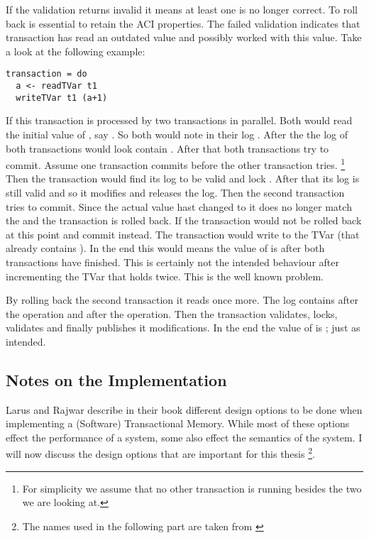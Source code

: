 If the validation returns invalid it means at least one  is no longer correct. To roll back is essential 
to retain the ACI properties. The failed validation indicates that transaction has read an outdated value and possibly worked 
with this value. Take a look at the following example:
\begin{lstlisting}
transaction = do 
  a <- readTVar t1
  writeTVar t1 (a+1)
\end{lstlisting}
If this transaction is processed by two transactions in parallel. Both would read the initial value of , say .
So both would note in their log . After the  the log of both transactions would look contain 
. After that both transactions try to commit. Assume one transaction commits before the other transaction tries.
\footnote{For simplicity we assume that no other transaction is running besides the two we are looking at.}
Then the transaction would find its log to be valid and lock . After that its log is still valid and so it modifies 
 and releases the log. 
Then the second transaction tries to commit. Since the actual value hast changed to  it does no longer match 
the  and the transaction is rolled back. If the transaction would not be rolled back at this point
and commit instead. The transaction would write  to the TVar (that already contains ). In the end 
this would means the value of  is  after both transactions have finished. This is certainly not the 
intended behaviour after incrementing the TVar that holds  twice. This is the well known 
problem. 

By rolling back the second transaction it reads  once more. The log contains  after the 
operation and  after the  operation. Then the transaction validates, locks, validates and 
finally publishes it modifications. In the end the value of  is ; just as intended.

\subsection{Notes on the Implementation}
Larus and Rajwar describe in their book\parencite[Chapter 2]{transBook} different design options to be done when implementing a 
(Software) Transactional Memory. While most of these options effect the performance of a system, some also effect the 
semantics of the system. I will now discuss the design options that are important for this thesis \footnote{The names used in the 
following part are taken from \parencite[Chapter 2]{transBook}}.

